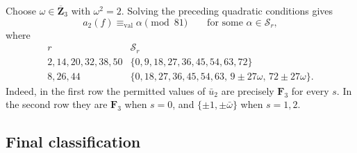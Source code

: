 \documentclass[11pt]{article}
\theoremstyle{plain}
\theoremstyle{definition}
\theoremstyle{remark}
\numberwithin{equation}{section}
\begin{document}
Choose \(\omega\in\overline{\mathbf Z}_3\) with \(\omega^2=2\). Solving the preceding quadratic conditions gives \begin{equation} a_2(f)\equiv_{\mathrm{val}}\alpha\pmod{81} \qquad\text{for some }\alpha\in\mathcal S_r, \label{eq:p3-mod81-zero-T2} \end{equation} where \[ 
\begin{array}{c|l}
r & \mathcal S_r\\ \hline
2,14,20,32,38,50
& \{0,9,18,27,36,45,54,63,72\}\\
8,26,44
& \{0,18,27,36,45,54,63,\,
9\pm27\omega,\,72\pm27\omega\}.
\end{array}
\]
Indeed, in the first row the permitted values of \(\bar u_2\) are precisely \(\mathbf F_3\) for every \(s\). In the second row they are \(\mathbf F_3\) when \(s=0\), and \(\{\pm1,\pm\bar\omega\}\) when \(s=1,2\).

\subsection{Final classification}
\end{document}

